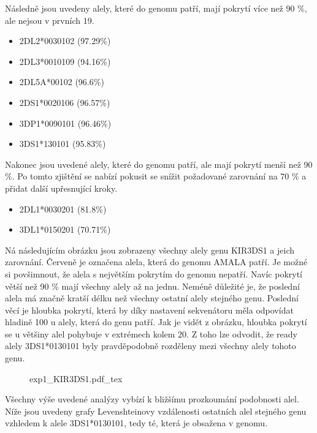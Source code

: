 \documentclass[czech,DP]{thesiskiv}
\numberwithin{equation}{section}
\begin{document}
\noindent
Následně jsou uvedeny alely, které do genomu patří, mají pokrytí více než 90 \%, ale nejsou v prvních 19.
\begin{multicols}{2}
\begin{itemize}
	\itemsep0em
	\item 2DL2*0030102 (97.29\%)
	\item 2DL3*0010109 (94.16\%)
	\item 2DL5A*00102 (96.6\%)
	\item 2DS1*0020106 (96.57\%)
	\item 3DP1*0090101 (96.46\%)
	\item 3DS1*130101 (95.83\%)
\end{itemize}
\end{multicols}


\noindent
Nakonec jsou uvedené alely, které do genomu patří, ale mají pokrytí menší než 90 \%. Po tomto zjištění se nabízí pokusit se snížit požadované zarovnání na 70 \% a přidat další upřesnující kroky.

\begin{multicols}{2}
\begin{itemize}
	\itemsep0em
	\item 2DL1*0030201 (81.8\%)
	\item 3DL1*0150201 (70.71\%)
\end{itemize}
\end{multicols}

\noindent
Ná následujícím obrázku jsou zobrazeny všechny alely genu KIR3DS1 a jeich zarovnání. Červeně je označena alela, která do genomu AMALA patří. Je možné si povšimnout, že alela s největším pokrytím do genomu nepatří. Navíc pokrytí větší než 90 \% mají všechny alely až na jednu. Neméně důležité je, že poslední alela má značně kratší délku než všechny ostatní alely stejného genu. Poslední věcí je hloubka pokrytí, která by díky nastavení sekvenátoru měla odpovídat hladině 100 u alely, která do genu patří. Jak je vidět z obrázku, hloubka pokrytí se u většiny alel pohybuje v extrémech kolem 20. Z toho lze odvodit, že ready alely 3DS1*0130101 byly pravděpodobně rozděleny mezi všechny alely tohoto genu.

\begin{figure}[H]
    \centering
    \def\svgwidth{\columnwidth}
    {exp1_KIR3DS1.pdf_tex} 
\end{figure}

\noindent
Všechny výše uvedené analýzy vybízí k bližšímu prozkoumání podobnosti alel. Níže jsou uvedeny grafy Levenshteinovy vzdálenosti ostatních alel stejného genu vzhledem k alele 3DS1*0130101, tedy té, která je obsažena v genomu.
\end{document}
